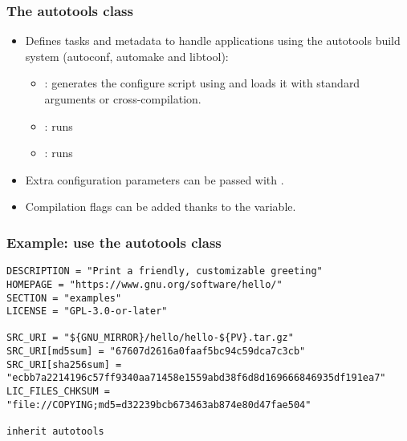 \begin{frame}
  \frametitle{The autotools class}
  \begin{itemize}
    \item Defines tasks and metadata to handle applications using the
          autotools build system (autoconf, automake and libtool):
    \begin{itemize}
      \item {}: generates the configure script using
             and loads it with standard arguments or
            cross-compilation.
      \item {}: runs 
      \item {}: runs 
    \end{itemize}
    \item Extra configuration parameters can be passed with
          .
    \item Compilation flags can be added thanks to the
           variable.
  \end{itemize}
\end{frame}

\begin{frame}[fragile]
  \frametitle{Example: use the autotools class}
  \begin{block}{}
    \begin{verbatim}
DESCRIPTION = "Print a friendly, customizable greeting"
HOMEPAGE = "https://www.gnu.org/software/hello/"
SECTION = "examples"
LICENSE = "GPL-3.0-or-later"

SRC_URI = "${GNU_MIRROR}/hello/hello-${PV}.tar.gz"
SRC_URI[md5sum] = "67607d2616a0faaf5bc94c59dca7c3cb"
SRC_URI[sha256sum] = "ecbb7a2214196c57ff9340aa71458e1559abd38f6d8d169666846935df191ea7"
LIC_FILES_CHKSUM = "file://COPYING;md5=d32239bcb673463ab874e80d47fae504"

inherit autotools
    \end{verbatim}
  \end{block}
\end{frame}

